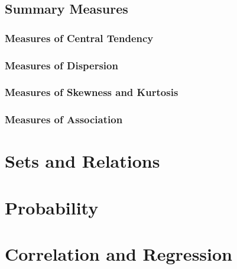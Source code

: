 \documentclass[]{book}
\begin{document}
\hypertarget{summary-measures}{%
\section{Summary Measures}\label{summary-measures}}

\hypertarget{measures-of-central-tendency}{%
\subsection{Measures of Central Tendency}\label{measures-of-central-tendency}}

\hypertarget{measures-of-dispersion}{%
\subsection{Measures of Dispersion}\label{measures-of-dispersion}}

\hypertarget{measures-of-skewness-and-kurtosis}{%
\subsection{Measures of Skewness and Kurtosis}\label{measures-of-skewness-and-kurtosis}}

\hypertarget{measures-of-association}{%
\subsection{Measures of Association}\label{measures-of-association}}

\hypertarget{sets-and-relations}{%
\chapter{Sets and Relations}\label{sets-and-relations}}

\hypertarget{probability}{%
\chapter{Probability}\label{probability}}

\hypertarget{correlation-and-regression}{%
\chapter{Correlation and Regression}\label{correlation-and-regression}}


\end{document}
